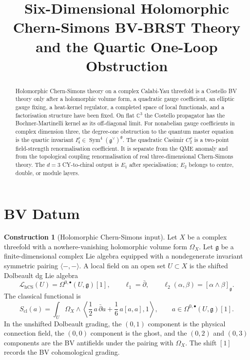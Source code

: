 \documentclass[11pt]{amsart}
\title{Six-Dimensional Holomorphic Chern-Simons BV-BRST Theory and the Quartic One-Loop Obstruction}
\author{}
\date{}
\providecommand{\C}{\mathbb{C}}
\providecommand{\dbar}{\bar{\partial}}
\providecommand{\fg}{\mathfrak{g}}
\providecommand{\Sym}{\operatorname{Sym}}
\providecommand{\hCS}{\operatorname{hCS}}
\providecommand{\cL}{\mathcal{L}}
\providecommand{\Eone}{E_1}
\providecommand{\Etwo}{E_2}
\theoremstyle{plain}
\theoremstyle{definition}
\newtheorem{construction}[theorem]{Construction}
\theoremstyle{remark}
\begin{document}
\maketitle

\begin{abstract}
Holomorphic Chern-Simons theory on a complex Calabi-Yau threefold is a
Costello BV theory only after a holomorphic volume form, a quadratic
gauge coefficient, an elliptic gauge fixing, a heat-kernel regulator,
a completed space of local functionals, and a factorisation structure
have been fixed.  On flat $\C^3$ the Costello propagator has the
Bochner-Martinelli kernel as its off-diagonal limit.  For nonabelian
gauge coefficients in complex dimension three, the degree-one
obstruction to the quantum master equation is the quartic invariant
$I_4^\rho\in\Sym^4(\fg^\vee)^\fg$.  The quadratic Casimir $C_2^\rho$
is a two-point field-strength renormalisation coefficient.  It is
separate from the QME anomaly and from the topological coupling
renormalisation of real three-dimensional Chern-Simons theory.  The
$d=3$ CY-to-chiral output is
$\Eone$ after specialisation; $\Etwo$ belongs to centre, double, or
module layers.
\end{abstract}

\tableofcontents

\section{BV Datum}
\label{sec:bv-datum}

\begin{construction}[Holomorphic Chern-Simons input]
\label{cons:hcs-input}
Let $X$ be a complex threefold with a nowhere-vanishing holomorphic
volume form $\Omega_X$.  Let $\fg$ be a finite-dimensional complex Lie
algebra equipped with a nondegenerate invariant symmetric pairing
$\langle-,-\rangle$.  A local field on an open set $U\subset X$ is the
shifted Dolbeault dg Lie algebra
\[
  \cL_{\hCS}(U)
  =
  \Omega^{0,\bullet}(U,\fg)[1],
  \qquad
  \ell_1=\dbar,\qquad
  \ell_2(\alpha,\beta)=[\alpha\wedge\beta]_\fg .
\]
The classical functional is
\[
  S_{\mathrm{cl}}(a)
  =
  \int_U \Omega_X\wedge
  \left\langle
    \frac12\,a\,\dbar a+\frac16\,a[a,a],
    1
  \right\rangle ,
  \qquad
  a\in\Omega^{0,\bullet}(U,\fg)[1].
\]
In the unshifted Dolbeault grading, the $(0,1)$ component is the
physical connection field, the $(0,0)$ component is the ghost, and the
$(0,2)$ and $(0,3)$ components are the BV antifields under the pairing
with $\Omega_X$.  The shift $[1]$ records the BV cohomological grading.
\end{construction}
\end{document}
